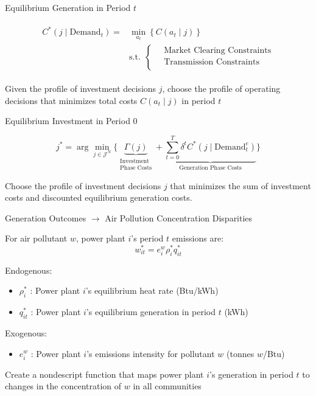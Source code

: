 \documentclass[11pt, aspectratio = 169]{beamer}
\newcommand{\1}{\mathds{1}}
\begin{document}
\begin{frame}{Equilibrium Generation in Period $t$}
    
\begin{align}
    \begin{split} \label{C_star}
        C^*(j\mid \text{Demand}_t) = &\min_{a_t}  \left\{ C(a_t\mid j)\right\} \\
        &\text{s.t.} ~~\begin{cases}
            \quad \text{Market Clearing Constraints}\\
            \quad \text{Transmission Constraints}\\
        \end{cases}
    \end{split}
\end{align}

\vfill
Given the profile of investment decisions $j$, choose the profile of operating decisions that minimizes total costs $C(a_t \mid j)$ in period $t$

\end{frame}


\begin{frame}{Equilibrium Investment in Period $0$}
    
\begin{equation}
    j^* = \arg\min_{j \in \mathcal{J}^N} \biggl\{ 
    \underbrace{\Gamma (j)}_{\substack{\text{Investment}\\ \text{Phase Costs}}} + \underbrace{\sum_{t=0}^T \delta^t C^*(j\mid \text{Demand}_t^e)}_{\text{Generation Phase Costs}}  \biggr\}
\end{equation}

\vfill
Choose the profile of investment decisions $j$ that minimizes the sum of investment costs and discounted equilibrium generation costs. 

\end{frame}


\begin{frame}{Generation Outcomes $\to$ Air Pollution Concentration Disparities}
    
For air pollutant $w$, power plant $i$'s period $t$ emissions are:
\begin{equation}
    w_{it}^* = e_i^w \rho_i^* q_{it}^*
\end{equation}

\vfill
Endogenous:
\begin{itemize}
    \item $\rho_i^*$ : Power plant $i$'s equilibrium heat rate (Btu/kWh)
    \item $q_{it}^*$ : Power plant $i$'s equilibrium generation in period $t$ (kWh)
\end{itemize}
Exogenous:
\begin{itemize}
    \item $e_i^w$ : Power plant $i$'s emissions intensity for pollutant $w$ (tonnes $w$/Btu)
\end{itemize}

\vfill
Create a nondescript function that maps power plant $i$'s generation in period $t$ to changes in the concentration of $w$ in all communities

\end{frame}
\end{document}
